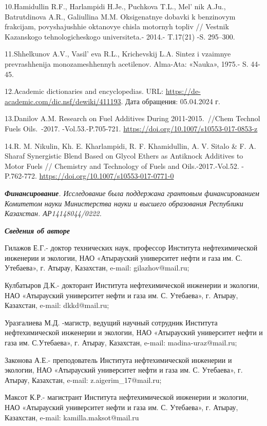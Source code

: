 10.Hamidullin R.F., Harlampidi H.Je., Puchkova T.L.,
Mel' nik A.Ju., Batrutdinova A.R., Galiullina M.M.
Oksigenatnye dobavki k benzinovym frakcijam, povyshajushhie oktanovye
chisla motornyh topliv // Vestnik Kazanskogo tehnologicheskogo
universiteta.- 2014.- T.17(21) -S. 295--300.

11.Shhelkunov A.V., Vasil' eva R.L., Krichevskij L.A.
Sintez i vzaimnye prevrashhenija monozameshhennyh acetilenov. Alma-Ata:
«Nauka», 1975.- S. 44-45.

12.Academic dictionaries and encyclopedias. URL:
\url{https://de-academic.com/dic.nsf/dewiki/411193}. Дата обращения:
05.04.2024 г.

13.Danilov A.M. Research on Fuel Additives During 2011-2015.~//Chem
Technol Fuels Oils.~-2017. -Vol.53.-P.705-721.
\url{https://doi.org/10.1007/s10553-017-0853-z}

14.R. M. Nikulin, Kh. E. Kharlampidi, R. F. Khamidullin, A. V. Sitalo \&
F. A. Sharaf Synergistic Blend Based on Glycol Ethers as Antiknock
Additives to Motor Fuels // Chemistry and Technology of Fuels and
Oils.-2017.-Vol.52. - P.762-772.
\url{https://doi.org/10.1007/s10553-017-0771-0}

\emph{{\bfseries Финансирование}. Исследование была поддержана грантовым
финансированием Комитетом науки Министерства науки и высшего образования
Республики Казахстан. АР14148044/0222.}

\emph{{\bfseries Сведения об авторе}}

Гилажов Е.Г.- доктор технических наук, профессор Института
нефтехимической инженерии и экологии, НАО «Атырауский университет нефти
и газа им. С. Утебаева», г. Атырау, Казахстан, e-mail: gilazhov@mail.ru;

Кулбатыров Д.К.- докторант Института нефтехимической инженерии и
экологии, НАО «Атырауский университет нефти и газа им. С. Утебаева», г.
Атырау, Казахстан, e-mail: dkkd@mail.ru;

Уразгалиева М.Д. -магистр, ведущий научный сотрудник Института
нефтехимической инженерии и экологии, НАО «Атырауский университет нефти
и газа им. С.Утебаева», г. Атырау, Казахстан, e-mail:
madina-uraz@mail.ru;

Законова А.Е.- преподователь Института нефтехимической инженерии и
экологии, НАО «Атырауский университет нефти и газа им. С. Утебаева», г.
Атырау, Казахстан, e-mail: z.aigerim\_17@mail.ru;

Максот К.Р.- магистрант Института нефтехимической инженерии и экологии,
НАО «Атырауский университет нефти и газа им. С. Утебаева», г. Атырау,
Казахстан, e-mail: kamilla.maksot@mail.ru

